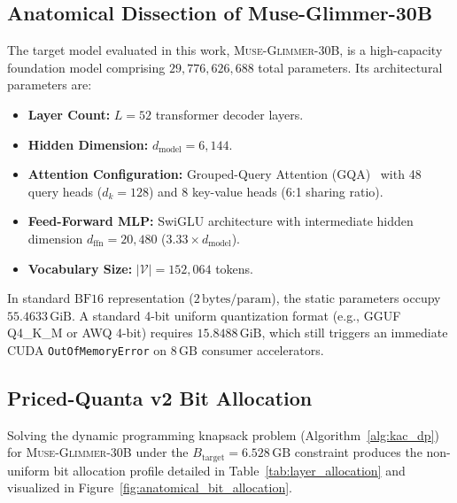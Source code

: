\documentclass[10pt,twocolumn,letterpaper]{article}
\newcommand{\modelname}{\textsc{Muse-Glimmer-30B}}
\begin{document}
\subsection{Anatomical Dissection of Muse-Glimmer-30B}
\label{sec:system_anatomy}
The target model evaluated in this work, \modelname{}, is a high-capacity foundation model comprising $29,776,626,688$ total parameters. Its architectural parameters are:
\begin{itemize}[leftmargin=*]
    \item \textbf{Layer Count:} $L = 52$ transformer decoder layers.
    \item \textbf{Hidden Dimension:} $d_{\text{model}} = 6,144$.
    \item \textbf{Attention Configuration:} Grouped-Query Attention (GQA)~\cite{ainslie2023gqa} with 48 query heads ($d_k = 128$) and 8 key-value heads (6:1 sharing ratio).
    \item \textbf{Feed-Forward MLP:} SwiGLU architecture with intermediate hidden dimension $d_{\text{ffn}} = 20,480$ ($3.33 \times d_{\text{model}}$).
    \item \textbf{Vocabulary Size:} $|\mathcal{V}| = 152,064$ tokens.
\end{itemize}

In standard $\text{BF16}$ representation ($2\,\text{bytes/param}$), the static parameters occupy $55.4633\,\text{GiB}$. A standard 4-bit uniform quantization format (e.g., GGUF Q4\_K\_M or AWQ 4-bit) requires $15.8488\,\text{GiB}$, which still triggers an immediate CUDA \texttt{OutOfMemoryError} on $8\,\text{GB}$ consumer accelerators.

\subsection{Priced-Quanta v2 Bit Allocation}
\label{sec:system_allocation}
Solving the dynamic programming knapsack problem (Algorithm~\ref{alg:kac_dp}) for \modelname{} under the $B_{\text{target}} = 6.528\,\text{GB}$ constraint produces the non-uniform bit allocation profile detailed in Table~\ref{tab:layer_allocation} and visualized in Figure~\ref{fig:anatomical_bit_allocation}.
\end{document}
